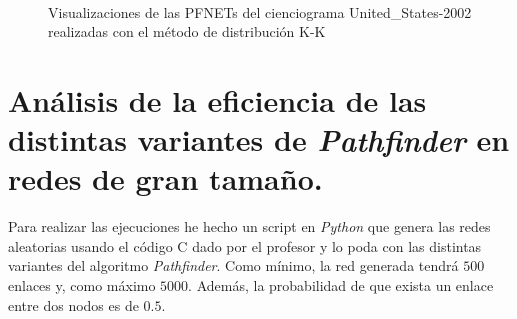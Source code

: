 \documentclass[10pt,a4paper,spanish]{article}
\numberwithin{equation}{section} %
\numberwithin{figure}{section} %
\numberwithin{table}{section} %
\begin{document}
\begin{figure}[!h]
    \centering
    \mbox{
    }
    \mbox{
    }
    \caption{Visualizaciones de las PFNETs del cienciograma United\_States-2002 realizadas con el método de distribución K-K}
    \label{kkus}
\end{figure}


\section{Análisis de la eficiencia de las distintas variantes de \textit{Pathfinder} en redes de gran tamaño.}
Para realizar las ejecuciones he hecho un script en \textit{Python} que genera las redes aleatorias usando el código C dado por el profesor y lo poda con las distintas variantes del algoritmo \textit{Pathfinder}. Como mínimo, la red generada tendrá $500$ enlaces y, como máximo $5000$. Además, la probabilidad de que exista un enlace entre dos nodos es de $0.5$.
\end{document}

